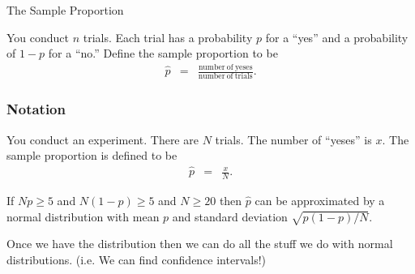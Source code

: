 \begin{frame}{The Sample Proportion}

  You conduct $n$ trials. Each trial has a probability $p$ for a
  ``yes'' and a probability of $1-p$ for a ``no.'' Define the sample
  proportion to be
  \begin{eqnarray*}
    \hat{p} & = & \frac{\mathrm{number~of~yeses}}{\mathrm{number~of~trials}}.
  \end{eqnarray*}



  
\end{frame}


\begin{frame}
  \frametitle{Notation}


  \begin{definition}

    You conduct an experiment. There are $N$ trials. The number of
    ``yeses'' is $x$.  The sample proportion is defined to be 
    \begin{eqnarray*}
      \hat{p} & = & \frac{x}{N}.
    \end{eqnarray*}

    {

      If $Np\geq 5$ and $N(1-p)\geq 5$ and $N\geq 20$ then $\hat{p}$
      can be approximated by a normal distribution with mean $p$ and
      standard deviation $\sqrt{p(1-p)/N}$.

    }

    {

      Once we have the distribution then we can do all the stuff we do
      with normal distributions. (i.e. We can find confidence intervals!)

    }

  \end{definition}
  
\end{frame}

